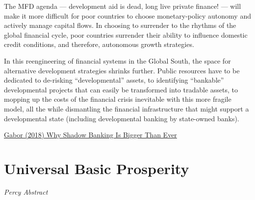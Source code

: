 \documentclass[
]{book}
\begin{document}
The MFD agenda --- development aid is dead, long live private finance! --- will make it more difficult for poor countries to choose monetary-policy autonomy and actively manage capital flows. In choosing to surrender to the rhythms of the global financial cycle, poor countries surrender their ability to influence domestic credit conditions, and therefore, autonomous growth strategies.

In this reengineering of financial systems in the Global South, the space for alternative development strategies shrinks further. Public resources have to be dedicated to de-risking ``developmental'' assets, to identifying ``bankable'' developmental projects that can easily be transformed into tradable assets, to mopping up the costs of the financial crisis inevitable with this more fragile model, all the while dismantling the financial infrastructure that might support a developmental state (including developmental banking by state-owned banks).

\href{https://jacobin.com/2018/11/why-shadow-banking-is-bigger-than-ever}{Gabor (2018) Why Shadow Banking Is Bigger Than Ever}

\hypertarget{universal-basic-prosperity}{%
\section{Universal Basic Prosperity}\label{universal-basic-prosperity}}

\emph{Percy Abstract}
\end{document}
